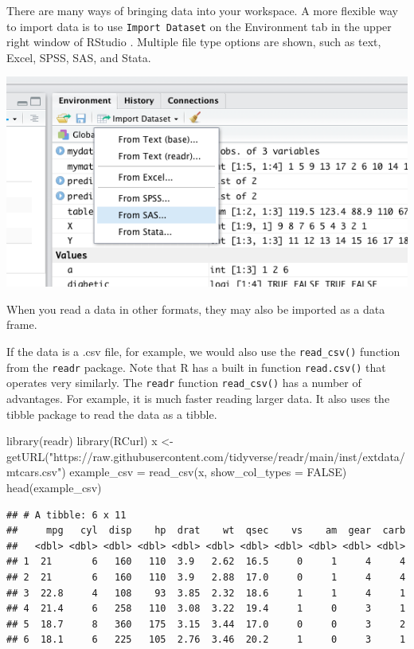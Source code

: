\documentclass[
]{book}
\newenvironment{Shaded}{\begin{snugshade}}{\end{snugshade}}
\newcommand{\AttributeTok}[1]{\textcolor[rgb]{0.77,0.63,0.00}{#1}}
\newcommand{\ConstantTok}[1]{\textcolor[rgb]{0.00,0.00,0.00}{#1}}
\newcommand{\FunctionTok}[1]{\textcolor[rgb]{0.00,0.00,0.00}{#1}}
\newcommand{\NormalTok}[1]{#1}
\newcommand{\OtherTok}[1]{\textcolor[rgb]{0.56,0.35,0.01}{#1}}
\newcommand{\StringTok}[1]{\textcolor[rgb]{0.31,0.60,0.02}{#1}}
\theoremstyle{definition}
\theoremstyle{definition}
\theoremstyle{definition}
\theoremstyle{definition}
\theoremstyle{remark}
\begin{document}
There are many ways of bringing data into your workspace. A more flexible way to import data is to use \texttt{Import\ Dataset} on the Environment tab in the upper right window of RStudio . Multiple file type options are shown, such as text, Excel, SPSS, SAS, and Stata.

\includegraphics[width=7.67in]{png/Import}

When you read a data in other formats, they may also be imported as a data frame.

If the data is a .csv file, for example, we would also use the \texttt{read\_csv()} function from the \texttt{readr} package. Note that R has a built in function \texttt{read.csv()} that operates very similarly. The \texttt{readr} function \texttt{read\_csv()} has a number of advantages. For example, it is much faster reading larger data. It also uses the tibble package to read the data as a tibble.

\begin{Shaded}
\begin{Highlighting}[]
\FunctionTok{library}\NormalTok{(readr)}
\FunctionTok{library}\NormalTok{(RCurl)}
\NormalTok{x }\OtherTok{\textless{}{-}} \FunctionTok{getURL}\NormalTok{(}\StringTok{"https://raw.githubusercontent.com/tidyverse/readr/main/inst/extdata/mtcars.csv"}\NormalTok{)}
\NormalTok{example\_csv }\OtherTok{=} \FunctionTok{read\_csv}\NormalTok{(x, }\AttributeTok{show\_col\_types =} \ConstantTok{FALSE}\NormalTok{)}
\FunctionTok{head}\NormalTok{(example\_csv)}
\end{Highlighting}
\end{Shaded}

\begin{verbatim}
## # A tibble: 6 x 11
##     mpg   cyl  disp    hp  drat    wt  qsec    vs    am  gear  carb
##   <dbl> <dbl> <dbl> <dbl> <dbl> <dbl> <dbl> <dbl> <dbl> <dbl> <dbl>
## 1  21       6   160   110  3.9   2.62  16.5     0     1     4     4
## 2  21       6   160   110  3.9   2.88  17.0     0     1     4     4
## 3  22.8     4   108    93  3.85  2.32  18.6     1     1     4     1
## 4  21.4     6   258   110  3.08  3.22  19.4     1     0     3     1
## 5  18.7     8   360   175  3.15  3.44  17.0     0     0     3     2
## 6  18.1     6   225   105  2.76  3.46  20.2     1     0     3     1
\end{verbatim}
\end{document}
